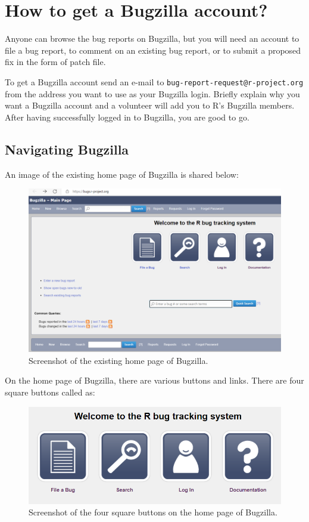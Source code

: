 \documentclass[
]{book}
\begin{document}
\hypertarget{bugzilla-account}{%
\section{How to get a Bugzilla account?}\label{bugzilla-account}}

Anyone can browse the bug reports on Bugzilla, but you will need an account to file a bug report, to comment on an existing bug report, or to submit a proposed fix in the form of patch file.

To get a Bugzilla account send an e-mail to \texttt{bug-report-request@r-project.org} from the address you want to use as your Bugzilla login. Briefly explain why you want a Bugzilla account and a volunteer will add you to R's Bugzilla members. After having successfully logged in to Bugzilla, you are good to go.

\hypertarget{Bugzilla}{%
\subsection{Navigating Bugzilla}\label{Bugzilla}}

An image of the existing home page of Bugzilla is shared below:

\begin{figure}
\centering
\includegraphics{img/bugzilla.png}
\caption{Screenshot of the existing home page of Bugzilla.}
\end{figure}

On the home page of Bugzilla, there are various buttons and links. There are four square buttons called as:

\begin{figure}
\centering
\includegraphics{img/squarebuttons.png}
\caption{Screenshot of the four square buttons on the home page of Bugzilla.}
\end{figure}
\end{document}
